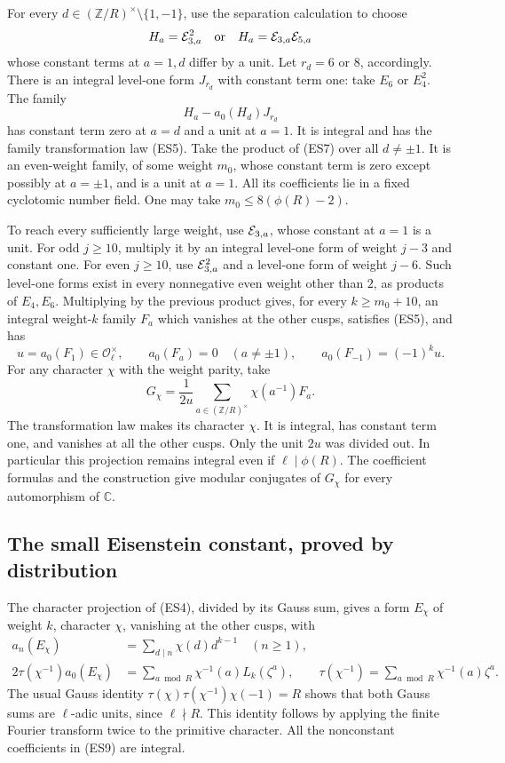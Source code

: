 For every \(d\in(\mathbb Z/R)^\times\setminus\{1,-1\}\), use
the separation calculation to choose
\[
 H_a={\cal E}_{3,a}^2\quad\hbox{or}\quad
 H_a={\cal E}_{3,a}{\cal E}_{5,a}
\]
whose constant terms at \(a=1,d\) differ by a unit.
Let \(r_d=6\) or \(8\), accordingly.
There is an integral level-one form \(J_{r_d}\) with constant
term one: take \(E_6\) or \(E_4^2\).
The family
\[
                 H_a-a_0(H_d)J_{r_d}
 \tag{ES7}
\]
has constant term zero at \(a=d\) and a unit at \(a=1\).
It is integral and has the family transformation law (ES5).
Take the product of (ES7) over all \(d\ne\pm1\).
It is an even-weight family, of some weight \(m_0\), whose
constant term is zero except possibly at \(a=\pm1\),
and is a unit at \(a=1\).
All its coefficients lie in a fixed cyclotomic number field.
One may take \(m_0\le8(\phi(R)-2)\).

To reach every sufficiently large weight, use
\({\cal E}_{3,a}\), whose constant at \(a=1\) is a unit.
For odd \(j\ge10\), multiply it by an integral level-one
form of weight \(j-3\) and constant one.
For even \(j\ge10\), use \({\cal E}_{3,a}^2\) and a level-one
form of weight \(j-6\).
Such level-one forms exist in every nonnegative even weight
other than \(2\), as products of \(E_4,E_6\).
Multiplying by the previous product gives, for every
\(k\ge m_0+10\), an integral weight-\(k\) family \(F_a\)
which vanishes at the other cusps, satisfies (ES5), and has
\[
  u=a_0(F_1)\in\mathcal O_\ell^\times,\qquad
  a_0(F_a)=0\quad(a\ne\pm1),\qquad
                   a_0(F_{-1})=(-1)^ku .
\]
For any character \(\chi\) with the weight parity, take
\[
             G_\chi=\frac1{2u}
               \sum_{a\in(\mathbb Z/R)^\times}\chi(a^{-1})F_a .
 \tag{ES8}
\]
The transformation law makes its character \(\chi\).
It is integral, has constant term one, and vanishes at all
the other cusps.
Only the unit \(2u\) was divided out.
In particular this projection remains integral even if
\(\ell\mid\phi(R)\).
The coefficient formulas and the construction give modular
conjugates of \(G_\chi\) for every automorphism of
\(\mathbb C\).

\subsection{The small Eisenstein constant, proved by distribution}
The character projection of (ES4), divided by its Gauss sum,
gives a form \(E_\chi\) of weight \(k\), character \(\chi\),
vanishing at the other cusps, with
\[
 \begin{split}
 a_n(E_\chi)&=\sum_{d\mid n}\chi(d)d^{k-1}\quad(n\ge1),\\
 2\tau(\chi^{-1})a_0(E_\chi)
        &=\sum_{a\bmod R}\chi^{-1}(a)L_k(\zeta^a),
            \qquad \tau(\chi^{-1})=\sum_{a\bmod R}
                                      \chi^{-1}(a)\zeta^a .
 \end{split}
 \tag{ES9}
\]
The usual Gauss identity
\(\tau(\chi)\tau(\chi^{-1})\chi(-1)=R\) shows that both
Gauss sums are \(\ell\)-adic units, since \(\ell\nmid R\).
This identity follows by applying the finite Fourier
transform twice to the primitive character.
All the nonconstant coefficients in (ES9) are integral.

